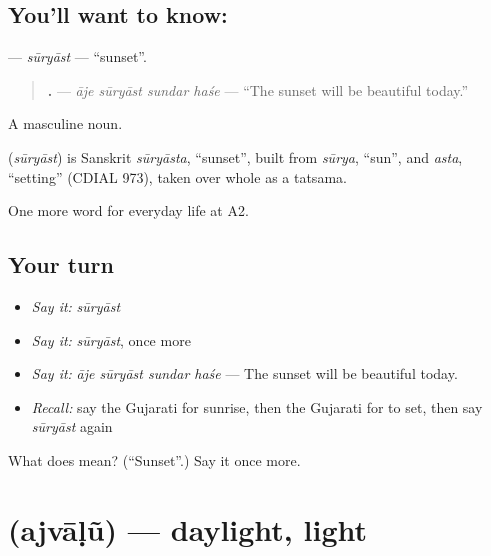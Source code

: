 \subsection*{You'll want to know: }
\textbf{} — \emph{sūryāst} — \textquotedblleft{}sunset\textquotedblright{}.

\begin{quote}
\textbf{   .} — \emph{āje sūryāst sundar haśe} — \textquotedblleft{}The sunset will be beautiful today.\textquotedblright{}
\end{quote}

A masculine noun.

\begin{cousinweb}
\textbf{} (\emph{sūryāst}) is Sanskrit \emph{sūryāsta}, \textquotedblleft{}sunset\textquotedblright{}, built from \emph{sūrya}, \textquotedblleft{}sun\textquotedblright{}, and \emph{asta}, \textquotedblleft{}setting\textquotedblright{} (CDIAL 973), taken over whole as a tatsama.
\end{cousinweb}

\begin{grammarlens}[title={What you've built}]
One more word for everyday life at A2.
\end{grammarlens}

\subsection*{Your turn}
\begin{itemize}
\raggedright
  \item \emph{Say it:} \emph{sūryāst}
  \item \emph{Say it:} \emph{sūryāst}, once more
  \item \emph{Say it:} \emph{āje sūryāst sundar haśe} — The sunset will be beautiful today.
  \item \emph{Recall:} say the Gujarati for sunrise, then the Gujarati for to set, then say \emph{sūryāst} again
\end{itemize}

\begin{tcolorbox}[breakable,colback=teal!4,colframe=teal!35!black,title={Before you move on}]
What does  mean? (\textquotedblleft{}Sunset\textquotedblright{}.) Say it once more.
\end{tcolorbox}
\section[\texorpdfstring{\gu{અજવાળું} (ajvāḷũ)}{અજવાળું (ajvāḷũ)}]{ (ajvāḷũ) — daylight, light}


